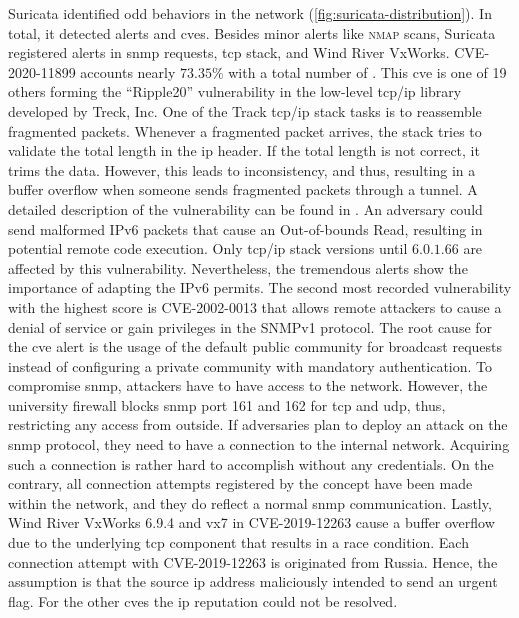 Suricata identified odd behaviors in the network (\autoref{fig:suricata-distribution}).
In total, it detected  alerts and \acsp{cve}.
Besides minor alerts like \textsc{nmap} scans, Suricata registered alerts in \ac{snmp} requests, \ac{tcp} stack, and Wind River VxWorks.
CVE-2020-11899 \cite{CVE-2020-11899} accounts nearly $73.35\%$ with a total number of .
This \acs{cve} is one of 19 others forming the \enquote{Ripple20} vulnerability in the low-level \ac{tcp}/\ac{ip} library developed by Treck, Inc.
One of the Track \ac{tcp}/\ac{ip} stack tasks is to reassemble fragmented packets.
Whenever a fragmented packet arrives, the stack tries to validate the total length in the \ac{ip} header.
If the total length is not correct, it trims the data.
However, this leads to inconsistency, and thus, resulting in a buffer overflow when someone sends fragmented packets through a tunnel.
A detailed description of the vulnerability can be found in \cite{ripple20}.
An adversary could send malformed IPv6 packets that cause an Out-of-bounds Read, resulting in potential remote code execution.
Only \ac{tcp}/\ac{ip} stack versions until $6.0.1.66$ are affected by this vulnerability.
Nevertheless, the tremendous alerts show the importance of adapting the IPv6 permits.
The second most recorded vulnerability with the highest score is CVE-2002-0013 \cite{CVE-2002-0013} that allows remote attackers to cause a denial of service or gain privileges in the SNMPv1 protocol.
The root cause for the \acs{cve} alert is the usage of the default public community for broadcast requests instead of configuring a private community with mandatory authentication.
To compromise \ac{snmp}, attackers have to have access to the network.
However, the university firewall blocks \ac{snmp} port 161 and 162 for \ac{tcp} and \ac{udp}, thus, restricting any access from outside.
If adversaries plan to deploy an attack on the \ac{snmp} protocol, they need to have a connection to the internal network.
Acquiring such a connection is rather hard to accomplish without any credentials.
On the contrary, all connection attempts registered by the concept have been made within the network, and they do reflect a normal \ac{snmp} communication.
Lastly, Wind River VxWorks 6.9.4 and vx7 in CVE-2019-12263 \cite{CVE-2019-12263} cause a buffer overflow due to the underlying \ac{tcp} component that results in a race condition.
Each connection attempt with CVE-2019-12263 is originated from Russia.
Hence, the assumption is that the source \ac{ip} address maliciously intended to send an urgent flag.
For the other \acsp{cve} the \ac{ip} reputation could not be resolved.

